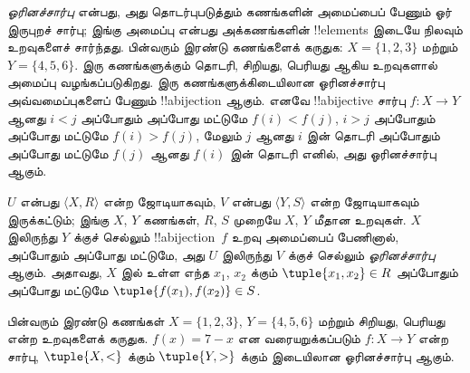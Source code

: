 \documentclass[../../../include/open-logic-section]{subfiles}
\begin{document}

\begin{explain}
\emph{ஓரினச்சார்பு} என்பது, அது தொடர்புபடுத்தும் கணங்களின்
அமைப்பைப் பேணும் ஓர் இருபுறச் சார்பு; இங்கு அமைப்பு என்பது
அக்கணங்களின் !!{element}s இடையே நிலவும் உறவுகளைச் சார்ந்தது.
பின்வரும் இரண்டு கணங்களைக் கருதுக: $X=\{1,2,3\}$ மற்றும்
$Y=\{4,5,6\}$. இரு கணங்களுக்கும் தொடரி, சிறியது,
பெரியது ஆகிய உறவுகளால் அமைப்பு வழங்கப்படுகிறது.
இரு கணங்களுக்கிடையிலான ஓரினச்சார்பு அவ்வமைப்புகளைப் பேணும்
!!a{bijection} ஆகும். எனவே !!a{bijective} சார்பு $f \colon X
\to Y$ ஆனது $i<j$ அப்போதும் அப்போது மட்டுமே $f(i)<f(j)$,
$i>j$ அப்போதும் அப்போது மட்டுமே $f(i)>f(j)$, மேலும் $j$ ஆனது
$i$ இன் தொடரி அப்போதும் அப்போது மட்டுமே $f(j)$ ஆனது
$f(i)$ இன் தொடரி எனில், அது ஓரினச்சார்பு ஆகும்.
\end{explain}

\begin{defn}[ஓரினச்சார்பு]
$U$ என்பது $\langle X, R\rangle$ என்ற ஜோடியாகவும், $V$ என்பது
$\langle Y, S\rangle$ என்ற ஜோடியாகவும் இருக்கட்டும்; இங்கு
$X$, $Y$ கணங்கள், $R$, $S$ முறையே $X$, $Y$ மீதான உறவுகள்.
$X$ இலிருந்து $Y$ க்குச் செல்லும் !!a{bijection}~$f$ உறவு
அமைப்பைப் பேணினால், அப்போதும் அப்போது மட்டுமே, அது $U$ இலிருந்து
$V$ க்குச் செல்லும் \emph{ஓரினச்சார்பு} ஆகும். அதாவது,
$X$ இல் உள்ள எந்த $x_{1}$, $x_{2}$ க்கும்
$\tuple{x_1,x_2} \in R$ அப்போதும் அப்போது மட்டுமே
$\tuple{f(x_1),f(x_2)} \in S$.
\end{defn}

\begin{ex}
பின்வரும் இரண்டு கணங்கள் $X=\{1,2,3\}$,
$Y=\{4,5,6\}$ மற்றும் சிறியது, பெரியது என்ற உறவுகளைக்
கருதுக. $f(x) = 7-x$ என வரையறுக்கப்படும்
$f\colon X \to Y$ என்ற சார்பு, $\tuple{X,<}$ க்கும்
$\tuple{Y,>}$ க்கும் இடையிலான ஓரினச்சார்பு ஆகும்.
\end{ex}
\end{document}
